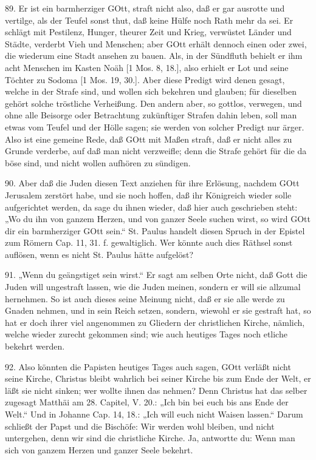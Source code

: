 89. Er ist ein barmherziger GOtt, straft nicht also, daß er gar ausrotte und vertilge, als der Teufel sonst thut, daß keine Hülfe noch Rath mehr da sei. Er schlägt mit Pestilenz, Hunger, theurer Zeit und Krieg, verwüstet Länder und Städte, verderbt Vieh und Menschen; aber GOtt erhält dennoch einen oder zwei, die wiederum eine Stadt ansehen zu bauen. Als, in der Sündfluth behielt er ihm acht Menschen im Kasten Noäh
[1 Mos. 8, 18.], also erhielt er Lot und seine Töchter zu Sodoma [1 Mos. 19, 30.]. Aber diese Predigt wird denen gesagt, welche in der Strafe sind, und wollen sich bekehren und glauben; für dieselben gehört solche tröstliche Verheißung. Den andern aber, so gottlos, verwegen, und ohne alle Beisorge oder Betrachtung zukünftiger Strafen dahin leben, soll man etwas vom Teufel und der Hölle sagen; sie werden von solcher Predigt nur ärger. Also ist eine gemeine Rede, daß GOtt mit Maßen straft, daß er nicht alles zu Grunde verderbe, auf daß man nicht verzweifle; denn die Strafe gehört für die da böse sind, und nicht wollen aufhören zu sündigen.

90. Aber daß die Juden diesen Text anziehen für ihre Erlösung, nachdem GOtt Jerusalem zerstört habe, und sie noch hoffen, daß ihr Königreich wieder solle aufgerichtet werden, da sage du ihnen wieder, daß hier auch geschrieben steht: „Wo du ihn von ganzem Herzen, und von ganzer Seele suchen wirst, so wird GOtt dir ein barmherziger GOtt sein.“ St. Paulus handelt diesen Spruch in der Epistel zum Römern Cap. 11, 31. f. gewaltiglich. Wer könnte auch dies Räthsel sonst auflösen, wenn es nicht St. Paulus hätte aufgelöst?

91. „Wenn du geängstiget sein wirst.“ Er sagt am selben Orte nicht, daß Gott die Juden will ungestraft lassen, wie die Juden meinen, sondern er will sie allzumal hernehmen. So ist auch dieses seine Meinung nicht, daß er sie alle werde zu Gnaden nehmen, und in sein Reich setzen, sondern, wiewohl er sie gestraft hat, so hat er doch ihrer viel angenommen zu Gliedern der christlichen Kirche, nämlich, welche wieder zurecht gekommen sind; wie auch heutiges Tages noch etliche bekehrt werden.

92. Also könnten die Papisten heutiges Tages auch sagen, GOtt verläßt nicht seine Kirche, Christus bleibt wahrlich bei seiner Kirche bis zum Ende der Welt, er läßt sie nicht sinken; wer wollte ihnen das nehmen? Denn Christus hat das selber zugesagt Matthäi am 28. Capitel, V. 20.: „Ich bin bei euch bis ans Ende der Welt.“ Und in Johanne Cap. 14, 18.: „Ich will euch nicht Waisen lassen.“ Darum schließt der Papst und die Bischöfe: Wir werden wohl bleiben, und nicht untergehen, denn wir sind die christliche Kirche. Ja, antwortte du: Wenn man sich von ganzem Herzen und ganzer Seele bekehrt.

